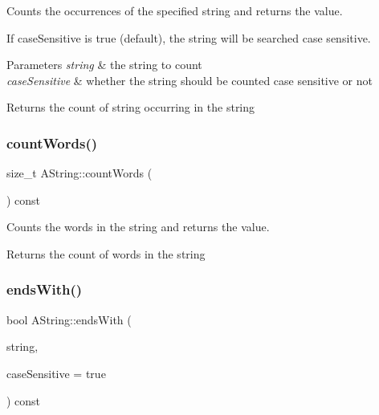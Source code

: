 Counts the occurrences of the specified string and returns the value. 

If case\+Sensitive is true (default), the string will be searched case sensitive.


\begin{DoxyParams}{Parameters}
{\em string} & the string to count \\
\hline
{\em case\+Sensitive} & whether the string should be counted case sensitive or not \\
\hline
\end{DoxyParams}
\begin{DoxyReturn}{Returns}
the count of string occurring in the string 
\end{DoxyReturn}
\mbox{\label{class_a_string_aed6d37a9b7bfd2dee2d50c37401a1dad}} 
\subsubsection{\texorpdfstring{countWords()}{countWords()}}
{\footnotesize\ttfamily size\+\_\+t A\+String\+::count\+Words (\begin{DoxyParamCaption}{ }\end{DoxyParamCaption}) const}



Counts the words in the string and returns the value. 

\begin{DoxyReturn}{Returns}
the count of words in the string 
\end{DoxyReturn}
\mbox{\label{class_a_string_ae73b26b17b08f56851737b5cf45a21e6}} 
\subsubsection{\texorpdfstring{endsWith()}{endsWith()}}
{\footnotesize\ttfamily bool A\+String\+::ends\+With (\begin{DoxyParamCaption}\item[{const \mbox{\hyperlink{class_a_string}{A\+String}} \&}]{string,  }\item[{bool}]{case\+Sensitive = {\ttfamily true} }\end{DoxyParamCaption}) const}



